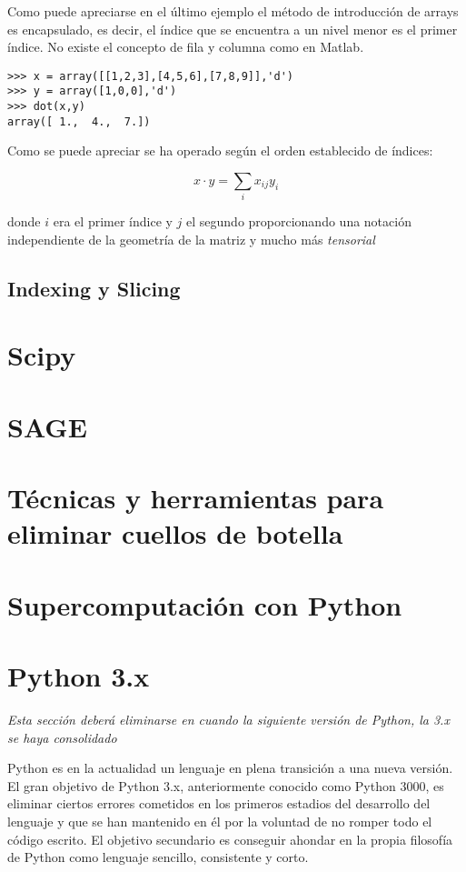 \documentclass[a4paper,10pt]{article}
\begin{document}
Como puede apreciarse en el último ejemplo el método de introducción
de arrays es encapsulado, es decir, el índice que se encuentra a un
nivel menor es el primer índice.  No existe el concepto de fila y
columna como en Matlab. 

\begin{lstlisting}
>>> x = array([[1,2,3],[4,5,6],[7,8,9]],'d')
>>> y = array([1,0,0],'d')
>>> dot(x,y)
array([ 1.,  4.,  7.])
\end{lstlisting}

Como se puede apreciar se ha operado según el orden establecido de
índices:

\[x \cdot y = \sum_i x_{ij}y_i  \]

donde $i$ era el primer índice y $j$ el segundo proporcionando una
notación independiente de la geometría de la matriz y mucho más
\emph{tensorial}

\subsection{Indexing y Slicing}

\section{Scipy}

\section{SAGE}

\section{Técnicas y herramientas para eliminar cuellos de botella}

\section{Supercomputación con Python}

\appendix

\section{Python 3.x}

\emph{Esta sección deberá eliminarse en cuando la siguiente versión de
Python, la 3.x se haya consolidado}

Python es en la actualidad un lenguaje en plena transición a una nueva
versión.  El gran objetivo de Python 3.x, anteriormente conocido como
Python 3000, es eliminar ciertos errores cometidos en los primeros
estadios del desarrollo del lenguaje y que se han mantenido en él por
la voluntad de no romper todo el código escrito. El objetivo
secundario es conseguir ahondar en la propia filosofía de Python como
lenguaje sencillo, consistente y corto.
\end{document}
